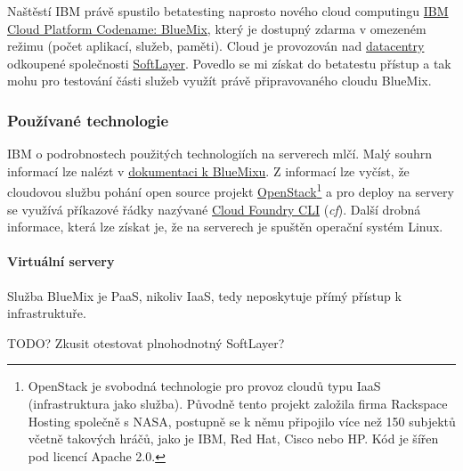 Naštěstí IBM právě spustilo betatesting naprosto nového cloud computingu \href{https://ace.ng.bluemix.net/}{IBM Cloud Platform Codename: BlueMix}\cite{bluemix:web}, který je dostupný zdarma v omezeném režimu (počet aplikací, služeb, paměti). Cloud je provozován nad \href{https://www.softlayer.com/about/datacenters}{datacentry} odkoupené společnosti \href{https://www.softlayer.com/}{SoftLayer}. Povedlo se mi získat do betatestu přístup a tak mohu pro testování části služeb využít právě připravovaného cloudu BlueMix.

\subsubsection{Používané technologie}
IBM o podrobnostech použitých technologiích na serverech mlčí. Malý souhrn informací lze nalézt v \href{https://www.ng.bluemix.net/docs/DeepDive.html}{dokumentaci k BlueMixu}. Z informací lze vyčíst, že cloudovou službu pohání open source projekt \href{https://www.openstack.org/}{OpenStack}\footnote{OpenStack je svobodná technologie pro provoz cloudů typu IaaS (infrastruktura jako služba). Původně tento projekt založila firma Rackspace Hosting společně s NASA, postupně se k němu připojilo více než 150 subjektů včetně takových hráčů, jako je IBM, Red Hat, Cisco nebo HP. Kód je šířen pod licencí Apache 2.0.\cite{toposs:openStack}} a pro deploy na servery se využívá příkazové řádky nazývané \href{https://github.com/cloudfoundry/cli}{Cloud Foundry CLI} (\textit{cf}). Další drobná informace, která lze získat je, že na serverech je spuštěn operační systém Linux.

\paragraph{Virtuální servery}
Služba BlueMix je PaaS, nikoliv IaaS, tedy neposkytuje přímý přístup k infrastruktuře.

TODO? Zkusit otestovat plnohodnotný SoftLayer?

